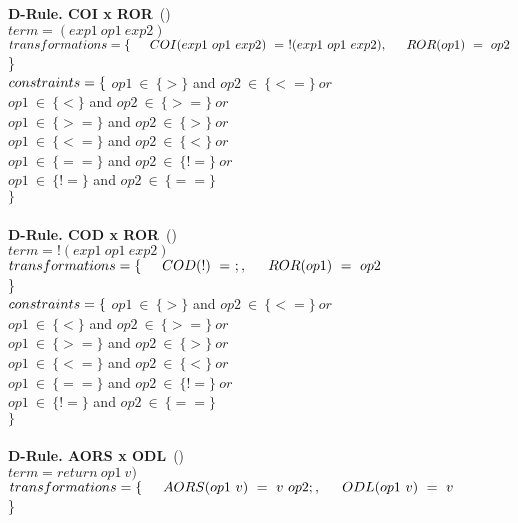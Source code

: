 \\
\\
\textbf{D-Rule. COI x ROR}~(\mujava{})\\
$term = (exp1~op1~exp2) $\\
$transformations = \{\\ \indent COI(exp1~op1~exp2)~=~!(exp1~op1~exp2),\\ \indent ROR(op1)~=~op2$\\\}\\
$constraints = \{ \\$ 
\indent $op1~\in~\{>\}$ and $ op2~\in~\{<=\}~or~ $\\
\indent $op1~\in~\{<\}$ and $ op2~\in~\{>=\}~or~  $\\ 
\indent $op1~\in~\{>=\}$ and $ op2~\in~\{>\}~or~  $\\ 
\indent $op1~\in~\{<=\}$ and $ op2~\in~\{<\}~or~  $\\ 
\indent $op1~\in~\{==\}$ and $ op2~\in~\{!=\}~or~  $\\ 
\indent $op1~\in~\{!=\}$ and $ op2~\in~\{==\}  $\\ 
$\}$
\\
\\
\textbf{D-Rule. COD x ROR}~(\mujava{})\\
$term = !(exp1~op1~exp2) $\\
$transformations = \{\\ \indent COD(!)~=~;,\\ \indent ROR(op1)~=~op2$\\\}\\
$constraints = \{ \\$ 
\indent $op1~\in~\{>\}$ and $ op2~\in~\{<=\}~or~ $\\
\indent $op1~\in~\{<\}$ and $ op2~\in~\{>=\}~or~  $\\ 
\indent $op1~\in~\{>=\}$ and $ op2~\in~\{>\}~or~  $\\ 
\indent $op1~\in~\{<=\}$ and $ op2~\in~\{<\}~or~  $\\ 
\indent $op1~\in~\{==\}$ and $ op2~\in~\{!=\}~or~  $\\ 
\indent $op1~\in~\{!=\}$ and $ op2~\in~\{==\}  $\\ 
$\}$
\\
\\
\textbf{D-Rule. AORS x ODL}~(\mujava{})\\
$term = return~op1~v) $\\
$transformations = \{\\ \indent AORS(op1~v)~=~v~op2;,\\ \indent ODL(op1~v)~=~v$\\\}\\
